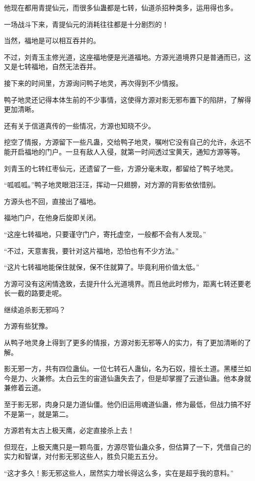 \begin{this_body}
他现在都用青提仙元，而很多仙蛊都是七转，仙道杀招种类多，运用得也多。

一场战斗下来，青提仙元的消耗往往都是十分剧烈的！

当然，福地是可以相互吞并的。

不过，刘青玉主修光道，这座福地便是光道福地。方源光道境界只是普通而已，这又是七转福地，自然无法吞并。

接下来的时间里，方源询问鸭子地灵，再次得到不少情报。

鸭子地灵还记得本体生前的不少事情，这使得方源对影无邪布置下的陷阱，了解得更加清晰。

还有关于信道真传的一些情况，方源也知晓不少。

挖空了情报，方源留下一些凡蛊，交给鸭子地灵，嘱咐它没有自己的允许，永远不能开启福地的门户。一旦有敌人入侵，就第一时间透过宝黄天，通知方源等等。

刘青玉的七转红枣仙元，还遗留了一些，方源分毫未取，都留给了鸭子地灵。

“呱呱呱。”鸭子地灵眼泪汪汪，挥动一只翅膀，对方源的背影依依惜别。

方源头也不回，直接出了福地。

福地门户，在他身后旋即关闭。

“这座七转福地，只要谨守门户，寄托虚空，一般都不会有人发现。”

“不过，天意害我，要针对这片福地，恐怕也有不少方法。”

“这片七转福地能保住就保，保不住就算了。毕竟利用价值太低。”

方源可没有这闲情逸致，去提升什么光道境界。而且他此时修为，距离七转还要老长一截的路要走呢。

继续追杀影无邪吗？

方源有些犹豫。

从鸭子地灵身上得到了更多的情报，方源对影无邪等人的实力，有了更加清晰的了解。

影无邪一方，共有四位蛊仙。一位七转石人蛊仙，名为石奴，擅长土道。黑楼兰如今是力、火兼修。太白云生的宙道仙蛊失去了，但是却掌握了云道仙蛊。他本身就兼修着云道。

至于影无邪，肉身只是力道仙僵。他仍旧运用魂道仙蛊，修为最低，但战力搞不好不是第一，就是第二。

方源若有太古上极天鹰，必定直接杀上去！

但现在，上极天鹰只是一颗鸟蛋，方源尽管仙蛊众多，但估算了一下，凭借自己的实力和智谋，对付影无邪这些人，胜负只能五五分。

“这才多久！影无邪这些人，居然实力增长得这么多，实在是超乎我的意料。”


\end{this_body}
